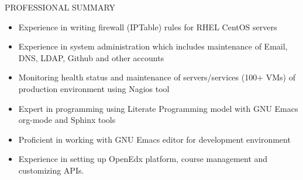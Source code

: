 \documentclass{resume} %
\begin{document}
\begin{rSection}{PROFESSIONAL SUMMARY}
\begin{itemize}
  \item Experience in writing firewall (IPTable) rules for
    RHEL CentOS servers

  \item Experience in system administration which includes maintenance
    of Email, DNS, LDAP, Github and other accounts

  \item Monitoring health status and maintenance of servers/services
    (100+ VMs) of production environment using Nagios tool

  \item Expert in programming using Literate Programming model with
    GNU Emacs org-mode and Sphinx tools

  \item Proficient in working with GNU Emacs editor for development
    environment
    
  \item Experience in setting up OpenEdx platform, course
    management and customizing APIs.
    

  \end{itemize}

\end{rSection}

\end{document}
